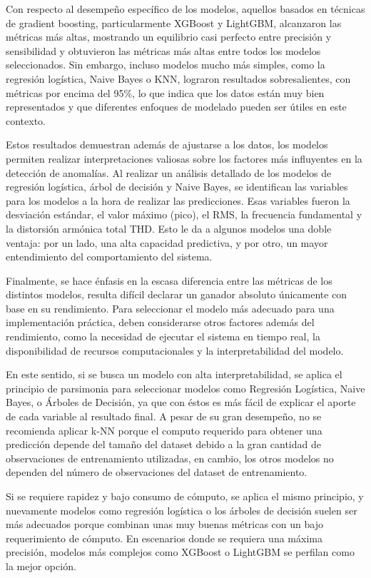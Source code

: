 \documentclass[11pt,a4paper,spanish]{book}
\numberwithin{equation}{chapter}
\numberwithin{figure}{chapter}
\begin{document}
Con respecto al desempeño específico de los modelos, aquellos basados en técnicas de 
gradient boosting, particularmente XGBoost y LightGBM, alcanzaron las métricas más altas, 
mostrando un equilibrio casi perfecto entre precisión y sensibilidad y obtuvieron las 
métricas más altas entre todos los modelos seleccionados. Sin embargo, incluso modelos 
mucho más simples, como la regresión logística, Naive Bayes o KNN, lograron resultados 
sobresalientes, con métricas por encima del 95\%, lo que indica que los datos están muy 
bien representados y que diferentes enfoques de modelado pueden ser útiles en este 
contexto.


Estos resultados demuestran además de ajustarse a los datos, los modelos permiten 
realizar interpretaciones valiosas sobre los factores más influyentes en la detección 
de anomalías. 
Al realizar un análisis detallado de los modelos de regresión logística, árbol de 
decisión y Naive Bayes, se identifican las variables para los modelos a la hora de 
realizar las predicciones. Esas variables fueron la desviación estándar, el valor 
máximo (pico), el RMS, la frecuencia fundamental y la distorsión armónica total THD. 
Esto le da a algunos modelos una doble ventaja: por un lado, una alta capacidad 
predictiva, y por otro, un mayor entendimiento del comportamiento del sistema.


Finalmente, se hace énfasis en la escasa diferencia entre las métricas de los distintos
modelos, resulta difícil declarar un ganador absoluto únicamente con base en su 
rendimiento. 
Para seleccionar el modelo más adecuado para una implementación práctica, deben 
considerarse otros factores además del rendimiento, como la necesidad de ejecutar el 
sistema en tiempo real, la disponibilidad de recursos computacionales y la 
interpretabilidad del modelo. 


En este sentido,  si se busca un modelo con alta interpretabilidad, se aplica el 
principio de parsimonia para seleccionar modelos como Regresión Logística, Naive Bayes,
o Árboles de Decisión, ya que con éstos es  más fácil de explicar el aporte de cada 
variable al  resultado final. A pesar de su gran desempeño, no se recomienda aplicar 
k-NN porque el computo requerido para obtener una predicción depende del tamaño del 
dataset debido a la gran cantidad de observaciones de entrenamiento utilizadas, en cambio,
los otros modelos no dependen del número de observaciones del dataset de entrenamiento. 


Si se requiere rapidez y bajo consumo de cómputo, se aplica el mismo principio, y 
nuevamente modelos como regresión logística o los árboles de decisión suelen ser más 
adecuados porque combinan unas muy buenas métricas con un bajo requerimiento de cómputo.
En escenarios donde se requiera una máxima precisión, modelos más complejos como 
XGBoost o LightGBM se perfilan como la mejor opción.
\end{document}
